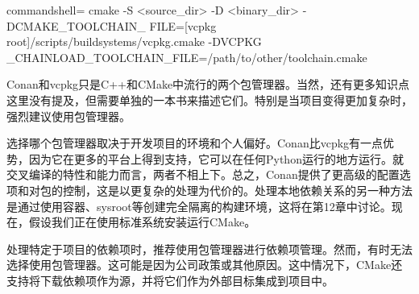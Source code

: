 \begin{tcblisting}{commandshell={}}
cmake -S <source_dir> -D <binary_dir> -DCMAKE_TOOLCHAIN_
  FILE=[vcpkg root]/scripts/buildsystems/vcpkg.cmake -DVCPKG
  _CHAINLOAD_TOOLCHAIN_FILE=/path/to/other/toolchain.cmake
\end{tcblisting}

Conan和vcpkg只是C++和CMake中流行的两个包管理器。当然，还有更多知识点这里没有提及，但需要单独的一本书来描述它们。特别是当项目变得更加复杂时，强烈建议使用包管理器。

选择哪个包管理器取决于开发项目的环境和个人偏好。Conan比vcpkg有一点优势，因为它在更多的平台上得到支持，它可以在任何Python运行的地方运行。就交叉编译的特性和能力而言，两者不相上下。总之，Conan提供了更高级的配置选项和对包的控制，这是以更复杂的处理为代价的。处理本地依赖关系的另一种方法是通过使用容器、sysroot等创建完全隔离的构建环境，这将在第12章中讨论。现在，假设我们正在使用标准系统安装运行CMake。

处理特定于项目的依赖项时，推荐使用包管理器进行依赖项管理。然而，有时无法选择使用包管理器。这可能是因为公司政策或其他原因。这中情况下，CMake还支持将下载依赖项作为源，并将它们作为外部目标集成到项目中。




